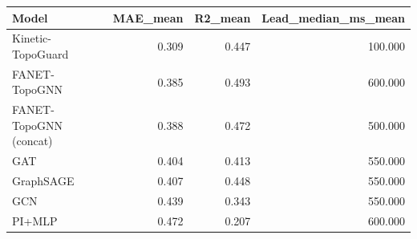 \begin{tabular}{lrrr}
\toprule
Model & MAE\_mean & R2\_mean & Lead\_median\_ms\_mean \\
\midrule
Kinetic-TopoGuard & 0.309 & 0.447 & 100.000 \\
FANET-TopoGNN & 0.385 & 0.493 & 600.000 \\
FANET-TopoGNN (concat) & 0.388 & 0.472 & 500.000 \\
GAT & 0.404 & 0.413 & 550.000 \\
GraphSAGE & 0.407 & 0.448 & 550.000 \\
GCN & 0.439 & 0.343 & 550.000 \\
PI+MLP & 0.472 & 0.207 & 600.000 \\
\bottomrule
\end{tabular}